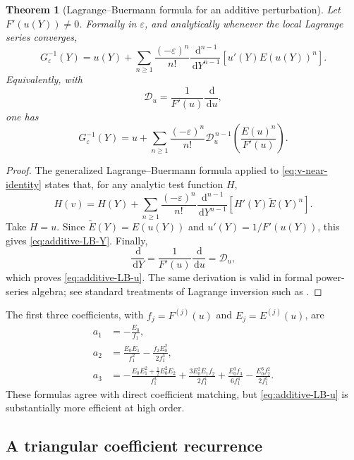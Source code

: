 \documentclass[11pt]{article}
\numberwithin{equation}{section}
\theoremstyle{mainthm}
\newtheorem{theorem}{Theorem}[section]
\theoremstyle{defstyle}
\theoremstyle{remark}
\newcommand{\dd}{\,\mathrm d}
\begin{document}
\begin{theorem}[Lagrange--Buermann formula for an additive perturbation]\label{thm:additive-LB}
Let \(F'(u(Y))\ne0\).  Formally in \(\varepsilon\), and analytically whenever the local Lagrange series converges,
\begin{equation}\label{eq:additive-LB-Y}
 G_\varepsilon^{-1}(Y)
 =u(Y)+\sum_{n\ge1}\frac{(-\varepsilon)^n}{n!}
 \frac{\dd^{n-1}}{\dd Y^{n-1}}
 \left[u'(Y)E(u(Y))^n\right].
\end{equation}
Equivalently, with
\begin{equation}\label{eq:transport-operator}
 \mathscr D_u=\frac1{F'(u)}\frac{\dd}{\dd u},
\end{equation}
one has
\begin{equation}\label{eq:additive-LB-u}
 \boxed{
 G_\varepsilon^{-1}(Y)
 =u+\sum_{n\ge1}\frac{(-\varepsilon)^n}{n!}
 \mathscr D_u^{\,n-1}
 \left(\frac{E(u)^n}{F'(u)}\right).}
\end{equation}
\end{theorem}

\begin{proof}
The generalized Lagrange--Buermann formula applied to \cref{eq:v-near-identity} states that, for any analytic test function \(H\),
\[
 H(v)=H(Y)+\sum_{n\ge1}\frac{(-\varepsilon)^n}{n!}
 \frac{\dd^{n-1}}{\dd Y^{n-1}}
 \left[H'(Y)\widetilde E(Y)^n\right].
\]
Take \(H=u\).  Since \(\widetilde E(Y)=E(u(Y))\) and \(u'(Y)=1/F'(u(Y))\), this gives \cref{eq:additive-LB-Y}.  Finally,
\[
 \frac{\dd}{\dd Y}
 =\frac1{F'(u)}\frac{\dd}{\dd u}=\mathscr D_u,
\]
which proves \cref{eq:additive-LB-u}.  The same derivation is valid in formal power-series algebra; see standard treatments of Lagrange inversion such as \cite{FlajoletSedgewick}.
\end{proof}

The first three coefficients, with \(f_j=F^{(j)}(u)\) and \(E_j=E^{(j)}(u)\), are
\begin{align}
 a_1&=-\frac{E_0}{f_1},\label{eq:a1-general}\\
 a_2&=\frac{E_0E_1}{f_1^2}-\frac{f_2E_0^2}{2f_1^3},\label{eq:a2-general}\\
 a_3&=-\frac{E_0E_1^2+\tfrac12E_0^2E_2}{f_1^3}
 +\frac{3E_0^2E_1f_2}{2f_1^4}
 +\frac{E_0^3f_3}{6f_1^4}
 -\frac{E_0^3f_2^2}{2f_1^5}.
 \label{eq:a3-general}
\end{align}
These formulas agree with direct coefficient matching, but \cref{eq:additive-LB-u} is substantially more efficient at high order.

\subsection{A triangular coefficient recurrence}
\end{document}
